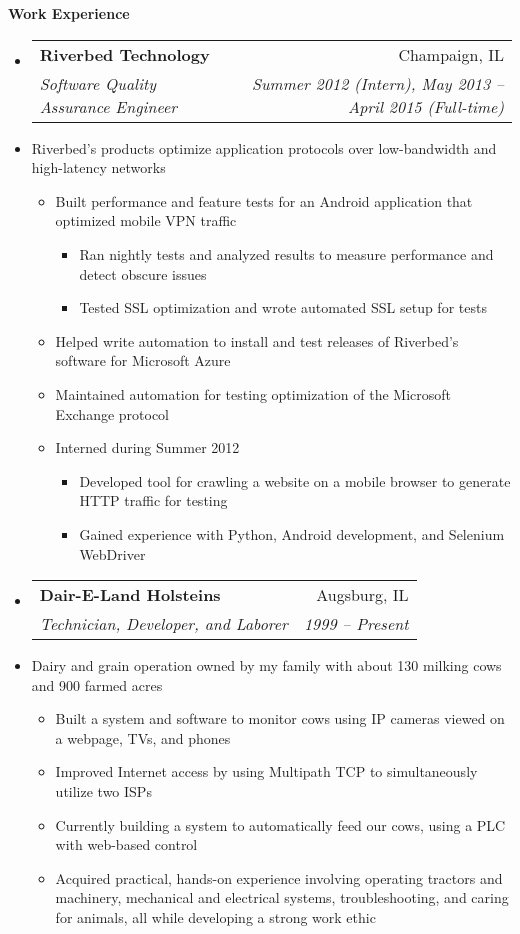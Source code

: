 \documentclass[letterpaper,11pt]{article}
\makeatletter
\newcommand{\resitem}[1]{\item #1 \vspace{-2pt}}
\newcommand{\resheading}[1]{{\large \colorbox{mygrey}{\begin{minipage}{\textwidth}{\textbf{#1 \vphantom{p\^{E}}}}\end{minipage}}}}
\newcommand{\ressubheading}[4]{
\begin{tabular*}{7.0in}{l@{\extracolsep{\fill}}r}
		\textbf{#1} & #2 \\
		\textit{#3} & \textit{#4} \\
\end{tabular*}\vspace{-6pt}}
\makeatother
\begin{document}
\vspace{0.1in}

\resheading{Work Experience}
\begin{itemize}
\item
	\ressubheading{Riverbed Technology}{Champaign, IL}{Software Quality Assurance Engineer}{Summer 2012 (Intern),  May 2013 -- April 2015 (Full-time)}
	\item[]{Riverbed's products optimize application protocols over low-bandwidth and high-latency networks}\vspace{-6pt}
	\begin{itemize}
		\resitem{Built performance and feature tests for an Android application that optimized mobile VPN traffic}
			\begin{itemize}
				\resitem{Ran nightly tests and analyzed results to measure performance and detect obscure issues}
				\resitem{Tested SSL optimization and wrote automated SSL setup for tests}
			\end{itemize}
		\resitem{Helped write automation to install and test releases of Riverbed's software for Microsoft Azure}
		\resitem{Maintained  automation for testing optimization of the Microsoft Exchange protocol}
		\resitem{Interned during Summer 2012}
			\begin{itemize}
				\resitem{Developed tool for crawling a website on a mobile browser to generate HTTP traffic for testing}
				\resitem{Gained experience with Python, Android development, and Selenium WebDriver}
			\end{itemize}
	\end{itemize}
\item
	\ressubheading{Dair-E-Land Holsteins}{Augsburg, IL}{Technician, Developer, and Laborer}{1999 -- Present}
	\item[]{Dairy and grain operation owned by my family with about 130 milking cows and 900 farmed acres}\vspace{-6pt}
	\begin{itemize}
		\resitem{Built a system and software to monitor cows using IP cameras viewed on a webpage, TVs, and phones}
		\resitem{Improved Internet access by using Multipath TCP to simultaneously utilize two ISPs}
		\resitem{Currently building a system to automatically feed our cows, using a PLC with web-based control}
		\resitem{Acquired practical, hands-on experience involving operating tractors and machinery, mechanical and electrical systems, troubleshooting, and caring for animals, all while developing a strong work ethic}
	\end{itemize}

\end{itemize}
\end{document}
